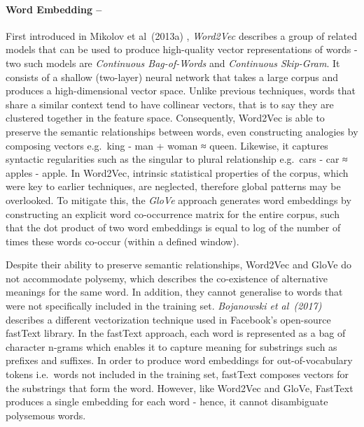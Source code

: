 \documentclass[12pt,a4paper]{article}
\begin{document}
\paragraph{Word Embedding --}
\noindent First introduced in Mikolov et al\ (2013a) \cite{mikolov2013efficient}, \textit{Word2Vec} describes a group of related models that can be used to produce high-quality vector representations of words - two such models are \textit{Continuous Bag-of-Words} and \textit{Continuous Skip-Gram}. It consists of a shallow (two-layer) neural network that takes a large corpus and produces a high-dimensional vector space. Unlike previous techniques, words that share a similar context tend to have collinear vectors, that is to say they are clustered together in the feature space. Consequently, Word2Vec is able to preserve the semantic relationships between words, even constructing analogies by composing vectors e.g.\ king - man + woman ≈ queen. Likewise, it captures syntactic regularities such as the singular to plural relationship e.g.\ cars - car ≈ apples - apple. In Word2Vec, intrinsic statistical properties of the corpus, which were key to earlier techniques, are neglected, therefore global patterns may be overlooked. To mitigate this, the \textit{GloVe} \cite{pennington2014glove} approach generates word embeddings by constructing an explicit word co-occurrence matrix for the entire corpus, such that the dot product of two word embeddings is equal to log of the number of times these words co-occur (within a defined window).

Despite their ability to preserve semantic relationships, Word2Vec and GloVe do not accommodate polysemy, which describes the co-existence of alternative meanings for the same word. In addition, they cannot generalise to words that were not specifically included in the training set. \textit{Bojanowski et al\ (2017)} \cite{bojanowski2016enriching} describes a different vectorization technique used in Facebook's open-source fastText library. In the fastText approach, each word is represented as a bag of character n-grams which enables it to capture meaning for substrings such as prefixes and suffixes. In order to produce word embeddings for out-of-vocabulary tokens i.e.\ words not included in the training set, fastText composes vectors for the substrings that form the word. However, like Word2Vec and GloVe, FastText produces a single embedding for each word - hence, it cannot disambiguate polysemous words.
\end{document}
